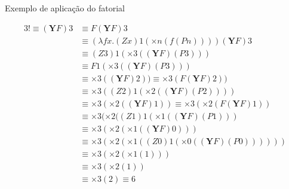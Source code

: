\begin{frame}[fragile]{Exemplo de aplicação do fatorial}

    \begin{align*}
        3! \equiv (\mathbf{Y}F)3 &\equiv F(\mathbf{Y}F)3 \\
        &\equiv (\lambda fx.(Zx)1(\times n(f(Pn))))(\mathbf{Y}F)3 \\
        &\equiv (Z3)1(\times 3((\mathbf{Y}F)(P3))) \\
        &\equiv F1(\times 3((\mathbf{Y}F)(P3))) \\
        &\equiv \times 3((\mathbf{Y}F)2)) \equiv \times 3(F(\mathbf{Y}F)2)) \\
        &\equiv \times 3((Z2)1(\times 2((\mathbf{Y}F)(P2)))) \\
        &\equiv \times 3(\times 2((\mathbf{Y}F)1)) \equiv \times 3(\times 2(F(\mathbf{Y}F)1)) \\
        &\equiv \times 3(\times 2((Z1)1(\times 1((\mathbf{Y}F)(P1))) \\
        &\equiv \times 3(\times 2(\times 1((\mathbf{Y}F)0))) \\
        &\equiv \times 3(\times 2(\times 1((Z0)1(\times 0((\mathbf{Y}F)(P0)))))) \\
        &\equiv \times 3(\times 2(\times 1(1))) \\
        &\equiv \times 3(\times 2(1)) \\
        &\equiv \times 3(2) \equiv 6
    \end{align*}

\end{frame}
